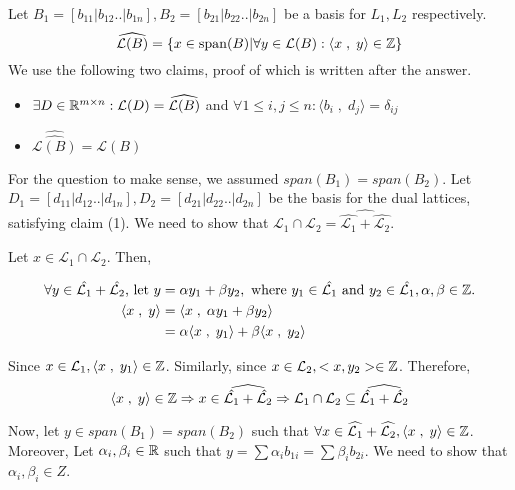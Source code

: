 Let $B_1 = [b_{11} | b_{12} .. | b_{1n}], B_2 = [b_{21} | b_{22} .. | b_{2n}]$ be a basis for $L_1, L_2$ respectively.
\[
\widehat{\mathcal{L}(B)} = \{x \in \operatorname{span}(B) | \forall y \in \mathcal{L}(B): \langle x\;,\;y \rangle \in \mathbb{Z}\}
\]
We use the following two claims, proof of which is written after the answer.

\begin{itemize}
    \item $\exists D \in \mathbb{R}^{m \times n}: \mathcal{L}(D) = \widehat{\mathcal{L}(B)}$ and $\forall 1 \le i, j \le n:  \langle b_i \;,\; d_j \rangle = \delta_{ij}$
    \item $\widehat{\widehat{\mathcal{L}(B)}} = \mathcal{L}(B)$
\end{itemize}

For the question to make sense, we assumed $span(B_1) = span(B_2)$. Let $D_1 = [d_{11} | d_{12} .. | d_{1n}], D_2 = [d_{21} | d_{22} .. | d_{2n}]$ be the basis for the dual lattices, satisfying claim (1). We need to show that $\mathcal{L}_1 \cap \mathcal{L}_2 = \widehat{\hat{\mathcal{L}_1} + \hat{\mathcal{L}_2}}$.

Let $x \in \mathcal{L}_1 \cap \mathcal{L}_2$. Then,

\begin{align*}
    \forall y \in \hat{\mathcal{L}_1} + \hat{\mathcal{L}_2}\text{, let }y &= \alpha y_1 + \beta y_2, \text{ where }y_1 \in \hat{\mathcal{L}_1} \text{ and }y_2 \in \hat{\mathcal{L}_1}, \alpha, \beta \in \mathbb{Z}. \\
    \langle x \;,\; y \rangle &= \langle x \;,\; \alpha y_1 + \beta y_2 \rangle \\
    &= \alpha \langle x \;,\; y_1 \rangle + \beta \langle x \;,\; y_2 \rangle 
\end{align*}

Since $x \in \mathcal{L}_1, \langle x \;,\; y_1 \rangle \in \mathbb{Z}$. Similarly, since $x \in \mathcal{L}_2, <x, y_2> \in \mathbb{Z}$.
Therefore,
\[\langle x \;,\; y \rangle \in \mathbb{Z} 
\Rightarrow x \in \widehat{\hat{\mathcal{L}_1} + \hat{\mathcal{L}_2}} \Rightarrow \mathcal{L}_1 \cap \mathcal{L}_2 \subseteq \widehat{\hat{\mathcal{L}_1} + \hat{\mathcal{L}_2}}\]

Now, let $y \in span(B_1) = span(B_2)$ such that $\forall x \in \widehat{\mathcal{L}_1} + \widehat{\mathcal{L}_2}, \langle x \;,\; y \rangle \in \mathbb{Z}$. Moreover, 
Let $\alpha_i, \beta_i \in \mathbb{R}$ such that $ y = \sum \alpha_i b_{1i} = \sum \beta_i b_{2i}$. We need to show that $\alpha_i, \beta_i \in Z$.

